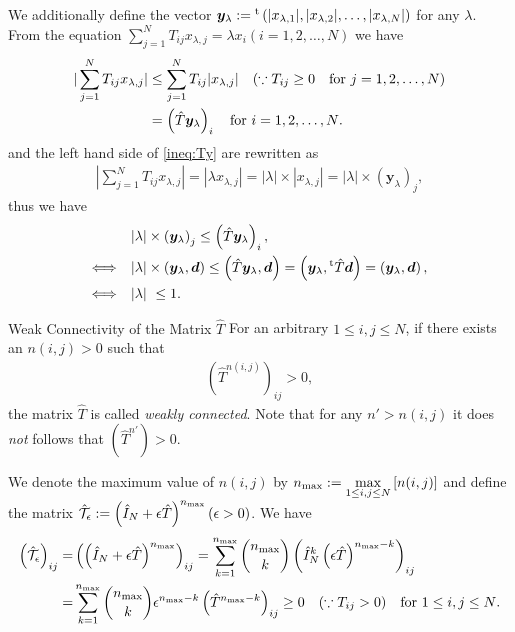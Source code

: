 We additionally define the vector $\bm{y}_{\lambda}:={}^{\rm t}\left(|x_{\lambda,1}|,|x_{\lambda,2}|,\dots,|x_{\lambda,N}|\right)$ for any $\lambda$. From the equation $\sum_{j=1}^{N}T_{ij}x_{\lambda,j}=\lambda x_{i}(i=1,2,\dots,N)$ we have
\begin{align}
|\sum_{j=1}^{N}T_{ij}x_{\lambda,j}| &\leq \sum_{j=1}^{N}T_{ij}|x_{\lambda,j}|\quad(\because T_{ij}\geq 0\quad\text{for $j=1,2,\dots,N$})\\
&=\left(\hat{T}\bm{y}_{\lambda}\right)_{i}\quad\text{\text{for $i=1,2,\dots,N$}}\label{ineq:Ty}.
\end{align}
and the left hand side of \eqref{ineq:Ty} are rewritten as
\begin{align}
|\sum_{j=1}^{N}T_{ij}x_{\lambda,j}| = |\lambda x_{\lambda,j}| = |\lambda|\times |x_{\lambda,j}| = |\lambda|\times \left(\bm{y}_{\lambda}\right)_{j},
\end{align}
thus we have
\begin{align}
& |\lambda|\times \left(\bm{y}_{\lambda}\right)_{j} \leq \left(\hat{T}\bm{y}_{\lambda}\right)_{i},\\
\Longleftrightarrow \quad& |\lambda|\times \left(\bm{y}_{\lambda},\bm{d}\right) \leq \left(\hat{T}\bm{y}_{\lambda},\bm{d}\right) = \left(\bm{y}_{\lambda},{}^{\rm t}\hat{T}\bm{d}\right) = \left(\bm{y}_{\lambda},\bm{d}\right), \\
\Longleftrightarrow \quad& |\lambda| \leq 1.
\end{align}

\begin{itembox}{Weak Connectivity of the Matrix $\hat{T}$}
	For an arbitrary $1\leq i,j\leq N$, if there exists an $n(i,j)>0$ such that
	\begin{align}
	\left(\hat{T}^{n(i,j)}\right)_{ij}>0,
	\end{align}
	the matrix $\hat{T}$ is called \textit{weakly connected}. Note that for any $n'>n(i,j)$ it does \textit{not} follows that $\left(\hat{T}^{n'}\right)>0$.
\end{itembox}

We denote the maximum value of $n(i,j)$ by $\displaystyle n_{\rm max}:=\max_{1\leq i,j\leq N}\left[n(i,j)\right]$ and define the matrix $\hat{\mathcal{T}}_{\epsilon}:=\left(\hat{I}_{N}+\epsilon \hat{T}\right)^{n_{\rm max}}(\epsilon>0)$. We have
\begin{align}
\left(\hat{\mathcal{T}}_{\epsilon}\right)_{ij} =& \left(\left(\hat{I}_{N}+\epsilon \hat{T}\right)^{n_{\rm max}}\right)_{ij} = \sum_{k=1}^{n_{\rm max}}\binom{n_{\rm max}}{k}\left({\hat{I}_{N}}^{k}\left(\epsilon \hat{T}\right)^{n_{\rm max}-k}\right)_{ij}\\
=& \sum_{k=1}^{n_{\rm max}}\binom{n_{\rm max}}{k}\epsilon^{n_{\rm max}-k}\left(\hat{T}^{n_{\rm max}-k}\right)_{ij} \geq 0 \quad(\because T_{ij}>0)\quad\text{for $1\leq i,j\leq N$}.
\end{align}

